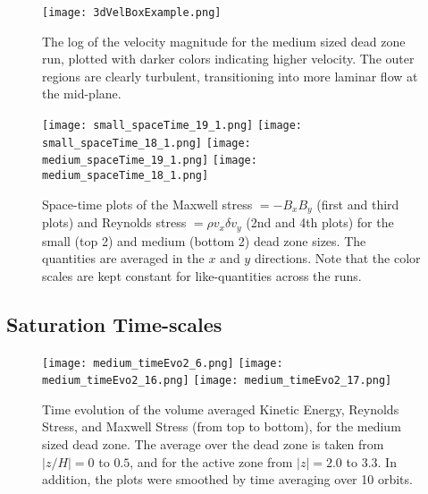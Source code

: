 \begin{figure}[p]
\centering
\texttt{[image: 3dVelBoxExample.png]}
\caption{The log of the velocity magnitude for the medium sized dead zone run, plotted with darker colors indicating higher velocity.  The outer regions are clearly turbulent, transitioning into more laminar flow at the mid-plane.  }
\label{fig3dBox}
\end{figure}

\begin{figure}[p]
\centering
\texttt{[image: small\_spaceTime\_19\_1.png]}
\texttt{[image: small\_spaceTime\_18\_1.png]}
\texttt{[image: medium\_spaceTime\_19\_1.png]}
\texttt{[image: medium\_spaceTime\_18\_1.png]}
\caption{Space-time plots of the Maxwell stress $=-B_x B_y$ (first and third plots) and Reynolds stress $=\rho v_x \delta v_y$ (2nd and 4th plots) for the small (top 2) and medium (bottom 2) dead zone sizes.  The quantities are averaged in the $x$ and $y$ directions.  Note that the color scales are kept constant for like-quantities across the runs. }
\label{figSTstress}
\end{figure}


\subsection{Saturation Time-scales}
\begin{figure}[p]
\centering
\texttt{[image: medium\_timeEvo2\_6.png]}
\texttt{[image: medium\_timeEvo2\_16.png]}
\texttt{[image: medium\_timeEvo2\_17.png]}
\caption{Time evolution of the volume averaged Kinetic Energy, Reynolds Stress, and Maxwell Stress (from top to bottom), for the medium sized dead zone.  The average over the dead zone is taken from $|z/H|=0$ to $0.5$, and for the active zone from $|z|=2.0$ to $3.3$.  In addition, the plots were smoothed by time averaging over 10 orbits. }
\label{figTimeEvo}
\end{figure}

